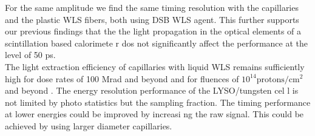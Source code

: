 For the same amplitude we find the same timing resolution with the capillaries and the plastic WLS fibers, both using DSB WLS agent.
This further supports our previous findings that the the light propagation in the optical elements of a scintillation based calorimete
r dos not significantly affect the performance at the level of 50 ps.\\   
The light extraction efficiency of capillaries with liquid WLS remains sufficiently high for dose rates of 100 Mrad and beyond and for
 fluences of $\mathrm{10^{14} protons/cm^{2}}$ and beyond \cite{shashlik2}. The energy resolution performance of the LYSO/tungsten cel
l is not limited by photo statistics but the sampling fraction. The timing performance at lower energies could be improved by increasi
ng the raw signal. This could be achieved by using larger diameter capillaries.\\ 

